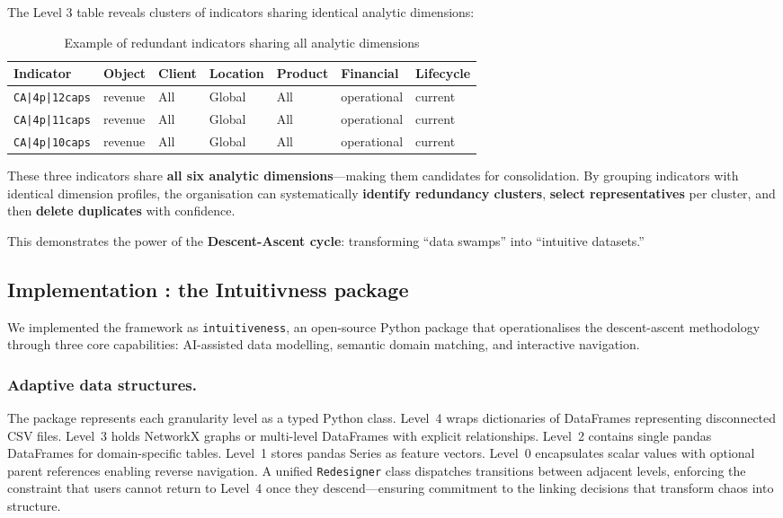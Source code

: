 \documentclass[12pt,a4paper]{article}
\begin{document}
The Level 3 table reveals clusters of indicators sharing identical analytic dimensions:

\begin{table}[h]
\centering
\small
\begin{tabular}{@{}lllllll@{}}
\toprule
\textbf{Indicator} & \textbf{Object} & \textbf{Client} & \textbf{Location} & \textbf{Product} & \textbf{Financial} & \textbf{Lifecycle} \\ \midrule
\texttt{CA|4p|12caps} & revenue & All & Global & All & operational & current \\
\texttt{CA|4p|11caps} & revenue & All & Global & All & operational & current \\
\texttt{CA|4p|10caps} & revenue & All & Global & All & operational & current \\ \bottomrule
\end{tabular}
\caption{Example of redundant indicators sharing all analytic dimensions}
\end{table}

These three indicators share \textbf{all six analytic dimensions}---making them candidates for consolidation. By grouping indicators with identical dimension profiles, the organisation can systematically \textbf{identify redundancy clusters}, \textbf{select representatives} per cluster, and then \textbf{delete duplicates} with confidence.

This demonstrates the power of the \textbf{Descent-Ascent cycle}: transforming ``data swamps'' into ``intuitive datasets.''

\subsection{Implementation : the Intuitivness package}


We implemented the framework as \texttt{intuitiveness}, an open-source Python package that operationalises the descent-ascent methodology through three core capabilities: AI-assisted data modelling, semantic domain matching, and interactive navigation.

\subsubsection{Adaptive data structures.}
The package represents each granularity level as a typed Python class. Level~4 wraps dictionaries of DataFrames representing disconnected CSV files. Level~3 holds NetworkX graphs or multi-level DataFrames with explicit relationships. Level~2 contains single pandas DataFrames for domain-specific tables. Level~1 stores pandas Series as feature vectors. Level~0 encapsulates scalar values with optional parent references enabling reverse navigation. A unified \texttt{Redesigner} class dispatches transitions between adjacent levels, enforcing the constraint that users cannot return to Level~4 once they descend---ensuring commitment to the linking decisions that transform chaos into structure.
\end{document}
